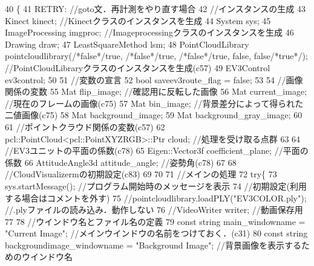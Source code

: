 \begin{DoxyCode}
40 \{
41     RETRY: \textcolor{comment}{//goto文．再計測をやり直す場合}
42     \textcolor{comment}{//インスタンスの生成}
43     Kinect kinect; \textcolor{comment}{//Kinectクラスのインスタンスを生成}
44     System sys; 
45     ImageProcessing imgproc; \textcolor{comment}{//Imageprocessingクラスのインスタンスを生成}
46     Drawing draw; 
47     LeastSquareMethod lsm; 
48     PointCloudLibrary pointcloudlibrary(\textcolor{comment}{/*false*/}\textcolor{keyword}{true}, \textcolor{comment}{/*false*/}\textcolor{keyword}{true}, \textcolor{comment}{/*false*/}\textcolor{keyword}{true}, \textcolor{keyword}{false}, \textcolor{keyword}{false}\textcolor{comment}{/*true*/});
       \textcolor{comment}{//PointCloudLibraryクラスのインスタンスを生成(c57)}
49     EV3Control ev3control; 
50 
51     \textcolor{comment}{//変数の宣言}
52     \textcolor{keywordtype}{bool} saveev3route\_flag = \textcolor{keyword}{false}; 
53 
54     \textcolor{comment}{//画像関係の変数}
55     Mat flip\_image; \textcolor{comment}{//確認用に反転した画像}
56     Mat current\_image; \textcolor{comment}{//現在のフレームの画像(c75)}
57     Mat bin\_image; \textcolor{comment}{//背景差分によって得られた二値画像(c75)}
58     Mat background\_image; 
59     Mat background\_gray\_image;
60 
61     \textcolor{comment}{//ポイントクラウド関係の変数(c57)}
62     pcl::PointCloud<pcl::PointXYZRGB>::Ptr cloud; \textcolor{comment}{//処理を受け取る点群}
63 
64     \textcolor{comment}{//EV3ユニットの平面の係数(c78)}
65     Eigen::Vector3f coefficient\_plane; \textcolor{comment}{//平面の係数}
66     AttitudeAngle3d attitude\_angle; \textcolor{comment}{//姿勢角(c78)}
67 
68     \textcolor{comment}{//CloudVisualizermの初期設定(c83)}
69 
70 
71     \textcolor{comment}{//メインの処理}
72     \textcolor{keywordflow}{try}\{
73         sys.startMessage(); \textcolor{comment}{//プログラム開始時のメッセージを表示}
74         \textcolor{comment}{//初期設定(利用する場合はコメントを外す)}
75         \textcolor{comment}{//pointcloudlibrary.loadPLY("EV3COLOR.ply"); //.plyファイルの読み込み．動作しない}
76         \textcolor{comment}{//VideoWriter writer; //動画保存用 }
77 
78         \textcolor{comment}{//ウインドウ名とファイル名の定義}
79         \textcolor{keyword}{const} \textcolor{keywordtype}{string} main\_windowname = \textcolor{stringliteral}{"Current Image"}; \textcolor{comment}{//メインウインドウの名前をつけておく．(c31)}
80         \textcolor{keyword}{const} \textcolor{keywordtype}{string} backgroundimage\_windowname = \textcolor{stringliteral}{"Background Image"}; \textcolor{comment}{//背景画像を表示するためのウインドウ名}

\end{DoxyCode}
